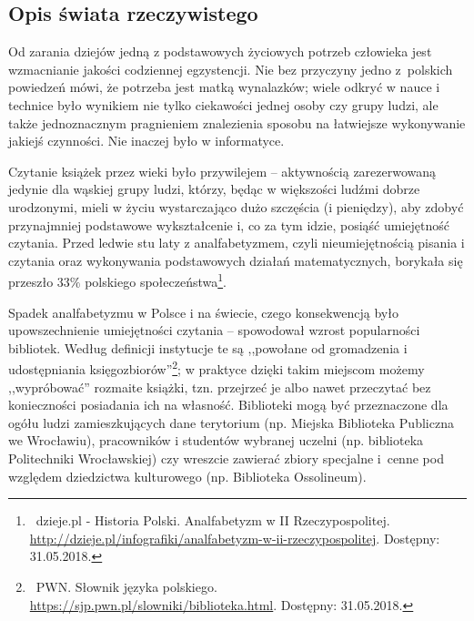 \documentclass[12pt, a4paper]{article}
\begin{document}
\subsection{Opis świata rzeczywistego}
Od zarania dziejów jedną z podstawowych życiowych potrzeb człowieka jest wzmacnianie jakości codziennej egzystencji. Nie bez przyczyny jedno z~polskich powiedzeń mówi, że potrzeba jest matką wynalazków; wiele odkryć w nauce i technice było wynikiem nie tylko ciekawości jednej osoby czy grupy ludzi, ale także jednoznacznym pragnieniem znalezienia sposobu na łatwiejsze wykonywanie jakiejś czynności. Nie inaczej było w informatyce.

Czytanie książek przez wieki było przywilejem -- aktywnością zarezerwowaną jedynie dla wąskiej grupy ludzi, którzy, będąc w większości ludźmi dobrze urodzonymi, mieli w życiu wystarczająco dużo szczęścia (i pieniędzy), aby zdobyć przynajmniej podstawowe wykształcenie i, co za tym idzie, posiąść umiejętność czytania. Przed ledwie stu laty z analfabetyzmem, czyli nieumiejętnością pisania i czytania oraz wykonywania podstawowych działań matematycznych, borykała się przeszło $33\%$ polskiego społeczeństwa\footnote{\ dzieje.pl - Historia Polski. Analfabetyzm w II Rzeczypospolitej. \url{http://dzieje.pl/infografiki/analfabetyzm-w-ii-rzeczypospolitej}. Dostępny: 31.05.2018.}.

Spadek analfabetyzmu w Polsce i na świecie, czego konsekwencją było upowszechnienie umiejętności czytania -- spowodował wzrost popularności bibliotek. Według definicji instytucje te są ,,powołane od gromadzenia i udostępniania księgozbiorów''\footnote{\ PWN. Słownik języka polskiego. \url{https://sjp.pwn.pl/slowniki/biblioteka.html}. Dostępny: 31.05.2018.}; w praktyce dzięki takim miejscom możemy ,,wypróbować'' rozmaite książki, tzn. przejrzeć je albo nawet przeczytać bez konieczności posiadania ich na własność. Biblioteki mogą być przeznaczone dla ogółu ludzi zamieszkujących dane terytorium (np. Miejska Biblioteka Publiczna we Wrocławiu), pracowników i studentów wybranej uczelni (np. biblioteka Politechniki Wrocławskiej) czy wreszcie zawierać zbiory specjalne i~cenne pod względem dziedzictwa kulturowego (np. Biblioteka Ossolineum).
\end{document}
